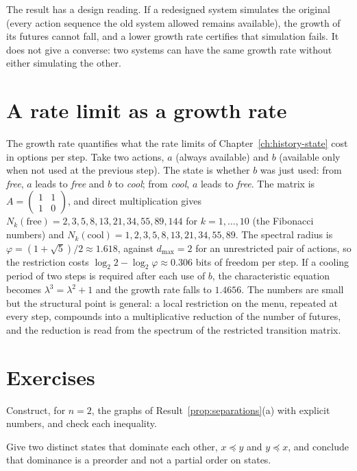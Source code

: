 The result has a design reading. If a redesigned system simulates the original (every action sequence the old system allowed remains available), the growth of its futures cannot fall, and a lower growth rate certifies that simulation fails. It does not give a converse: two systems can have the same growth rate without either simulating the other.

\section{A rate limit as a growth rate}\label{sec:rate-growth}

The growth rate quantifies what the rate limits of Chapter~\ref{ch:history-state} cost in options per step. Take two actions, $a$ (always available) and $b$ (available only when not used at the previous step). The state is whether $b$ was just used: from \emph{free}, $a$ leads to \emph{free} and $b$ to \emph{cool}; from \emph{cool}, $a$ leads to \emph{free}. The matrix is $A=\begin{pmatrix}1&1\\1&0\end{pmatrix}$, and direct multiplication gives $N_k(\mathrm{free})=2,3,5,8,13,21,34,55,89,144$ for $k=1,\dots,10$ (the Fibonacci numbers) and $N_k(\mathrm{cool})=1,2,3,5,8,13,21,34,55,89$. The spectral radius is $\varphi=(1+\sqrt5)/2\approx1.618$, against $d_{\max}=2$ for an unrestricted pair of actions, so the restriction costs $\log_2 2-\log_2\varphi\approx0.306$ bits of freedom per step. If a cooling period of two steps is required after each use of $b$, the characteristic equation becomes $\lambda^3=\lambda^2+1$ and the growth rate falls to $1.4656$. The numbers are small but the structural point is general: a local restriction on the menu, repeated at every step, compounds into a multiplicative reduction of the number of futures, and the reduction is read from the spectrum of the restricted transition matrix.

\section*{Exercises}

\begin{exercise}
Construct, for $n=2$, the graphs of Result~\ref{prop:separations}(a) with explicit numbers, and check each inequality.
\end{exercise}

\begin{exercise}
Give two distinct states that dominate each other, $x\preceq y$ and $y\preceq x$, and conclude that dominance is a preorder and not a partial order on states.
\end{exercise}

